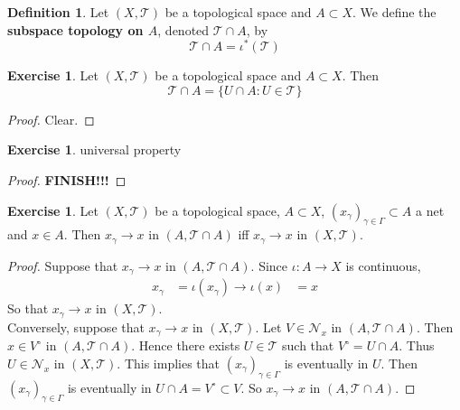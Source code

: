 \documentclass[12pt]{amsart}
\theoremstyle{definition}
\newtheorem{defn}[definition]{Definition}
\newtheorem{ex}[definition]{Exercise}
\newcommand{\gam}{\gamma}
\newcommand{\Gam}{\Gamma}
\newcommand{\MN}{\mathcal{N}}
\newcommand{\MT}{\mathcal{T}}
\begin{document}
	\begin{defn}
	Let $(X, \MT)$ be a topological space and $A \subset X$. We define the \textbf{subspace topology on $A$}, denoted $\MT \cap A$, by $$\MT \cap A = \iota^*(\MT)$$
	\end{defn}
	
	\begin{ex}
	Let $(X, \MT)$ be a topological space and $A \subset X$. Then $$\MT \cap A = \{U \cap A: U \in \MT\}$$
	\end{ex}
	
	\begin{proof}
	Clear.
	\end{proof}
	
	\begin{ex}
	universal property
	\end{ex}
	
	\begin{proof}
	\textbf{FINISH!!!}
	\end{proof}
	
	\begin{ex}
	Let $(X, \MT)$ be a topological space, $A \subset X$, $(x_{\gam})_{\gam \in \Gam} \subset A$ a net and $x \in A$. Then $x_{\gam} \rightarrow x$ in $(A,\MT \cap A)$ iff $x_{\gam} \rightarrow x$ in $(X,\MT)$.
	\end{ex}
	
	\begin{proof}
	Suppose that $x_{\gam} \rightarrow x$ in $(A,\MT \cap A)$. Since $\iota: A \rightarrow X$ is continuous, 
	\begin{align*}
	x_{\gam} 
	&= \iota(x_{\gam}) \rightarrow \iota(x) 
	&= x
	\end{align*}
	So that $x_{\gam} \rightarrow x$ in $(X,\MT)$. \\
	Conversely, suppose that $x_{\gam} \rightarrow x$ in $(X,\MT)$. Let $V \in \MN_{x}$ in $(A, \MT \cap A)$. Then $x \in V^{\circ}$ in  $(A, \MT \cap A)$. Hence there exists $U \in \MT$ such that $V^{\circ} = U \cap A$. Thus $U \in \MN_x$ in $(X, \MT)$. This implies that $(x_{\gam})_{\gam \in \Gam}$ is eventually in $U$. Then $(x_{\gam})_{\gam \in \Gam}$ is eventually in $U \cap A = V^{\circ} \subset V$. So $x_{\gam} \rightarrow x$ in $(A, \MT \cap A)$.  
	\end{proof}
	
	
	
	
	
	
	
	
	
	
	
	
	
\end{document}
